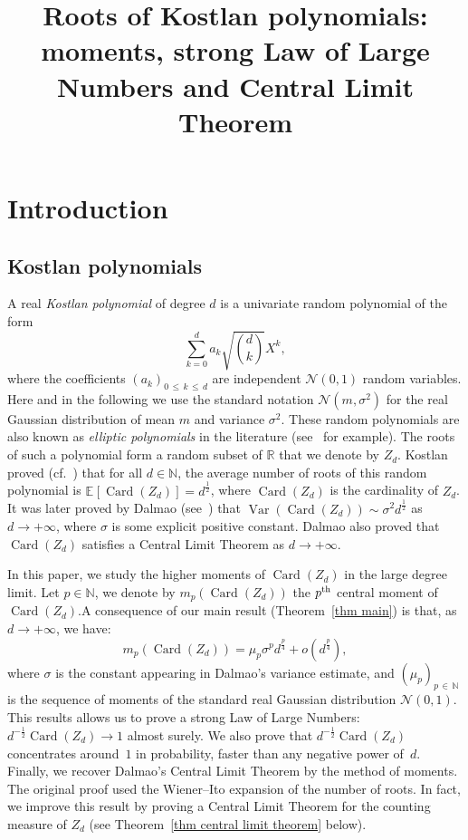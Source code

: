 \documentclass[AHL,Unicode,longabstracts,published]{cedram}
\title[Roots of Kostlan polynomials]{Roots of Kostlan polynomials: moments, strong Law of Large Numbers and Central Limit Theorem}
\author[\initial{M.} \lastname{Ancona}]{\firstname{Michele} \lastname{Ancona}}
\author[\initial{T.} \lastname{Letendre}]{\firstname{Thomas} \lastname{Letendre}}
\DeclareMathOperator{\card}{Card}
\DeclareMathOperator{\Var}{Var}
\newcommand{\clN}{\mathcal{N}}
\newcommand{\N}{\mathbb{N}}
\newcommand{\R}{\mathbb{R}}
\newcommand{\esp}[2][]{\mathbb{E}_{#1}\!\left[#2 \right]}
\newcommand{\var}[1]{\Var\!\left(#1 \right)}
\renewcommand{\leq}{\leqslant}
\begin{document}
\maketitle



\tableofcontents
\newpage


\section{Introduction}\label{sec introduction}

\subsection*{Kostlan polynomials}

A real \emph{Kostlan polynomial} of degree $d$ is a univariate random polynomial of the form
\[
\sum_{k=0}^d a_k \sqrt{\binom{d}{k}}X^k,
\]
where the coefficients $(a_k)_{0\,\leq\,k\,\leq\, d}$ are independent $\clN(0,1)$ random variables. Here and in the following we use the standard notation $\clN(m,\sigma^2)$ for the real Gaussian distribution of mean $m$ and variance $\sigma^2$. These random polynomials are also known as \emph{elliptic polynomials} in the literature (see~\cite{ST2004} for example). The roots of such a polynomial form a random subset of $\R$ that we denote by $Z_d$. Kostlan proved (cf.~\cite{Kos1993}) that for all $d \in \N$, the average number of roots of this random polynomial is $\esp{\card(Z_d)} = d^\frac{1}{2}$, where $\card(Z_d)$ is the cardinality of $Z_d$. It was later proved by Dalmao (see~\cite{Dal2015}) that $\var{\card(Z_d)} \sim \sigma^2 d^\frac{1}{2}$ as $d \to +\infty$, where $\sigma$ is some explicit positive constant. Dalmao also proved that $\card(Z_d)$ satisfies a Central Limit Theorem as $d \to +\infty$.

In this paper, we study the higher moments of $\card(Z_d)$ in the large degree limit. Let $p \in \N$, we denote by $m_p(\card(Z_d))$ the $p^{\rm th}$ central moment of $\card(Z_d)$.\linebreak A consequence of our main result (Theorem~\ref{thm main}) is that, as $d \to +\infty$, we have:
\[
m_p\left(\card(Z_d)\right) = \mu_p \sigma^p d^\frac{p}{4} + o\left(d^\frac{p}{4}\right),
\]
where $\sigma$ is the constant appearing in Dalmao's variance estimate, and $(\mu_p)_{p \,\in\,\N}$ is the sequence of moments of the standard real Gaussian distribution $\clN(0,1)$. This results allows us to prove a strong Law of Large Numbers: $d^{-\frac{1}{2}}\card(Z_d) \to 1$ almost surely. We also prove that $d^{-\frac{1}{2}}\card(Z_d)$ concentrates around~$1$ in probability, faster than any negative power of~$d$. Finally, we recover Dalmao's Central Limit Theorem by the method of moments. The original proof used the Wiener--Ito expansion of the number of roots. In fact, we improve this result by proving a Central Limit Theorem for the counting measure of $Z_d$ (see Theorem~\ref{thm central limit theorem} below).
\end{document}
